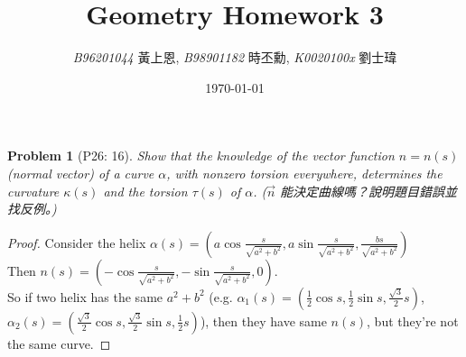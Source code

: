 \documentclass[10pt,a4paper]{article}
\newcommand{\LiHei}{\CJKfamily{lh}}
\newcounter{theProblemCounter}
\newtheorem{problem}[theProblemCounter]{Problem}
\begin{document}
\title{{Geometry Homework 3}}
\author{{\it{B96201044}} {\LiHei 黃上恩}, {\it{B98901182}} {\LiHei 時丕勳}, {\it{K0020100x}} {\LiHei 劉士瑋}}
\date{\today}
\maketitle

\setcounter{theProblemCounter}{2}
\begin{problem}[P26: 16]
Show that the knowledge of the vector function $n=n(s)$ (normal vector) of a curve $\alpha$, with nonzero torsion everywhere, determines the curvature $\kappa(s)$ and the torsion $\tau(s)$ of $\alpha$.  ($\vec{n}$ 能決定曲線嗎？說明題目錯誤並找反例。)
\end{problem}
\begin{proof}
Consider the helix $\alpha(s)=(a\cos{\frac{s}{\sqrt{a^2+b^2}}},a\sin{\frac{s}{\sqrt{a^2+b^2}}},{\frac{bs}{\sqrt{a^2+b^2}}})$\\
Then $n(s)=(-\cos{\frac{s}{\sqrt{a^2+b^2}}},-\sin{\frac{s}{\sqrt{a^2+b^2}}},0)$.\\
So if two helix has the same $a^2+b^2$ (e.g. $\alpha_1(s)=(\frac{1}{2}\cos{s},\frac{1}{2}\sin{s},\frac{\sqrt{3}}{2}s)$, $\alpha_2(s)=(\frac{\sqrt{3}}{2}\cos{s},\frac{\sqrt{3}}{2}\sin{s},\frac{1}{2}s)$), then they have same $n(s)$, but they're not the same curve.
\end{proof}
\end{document}
